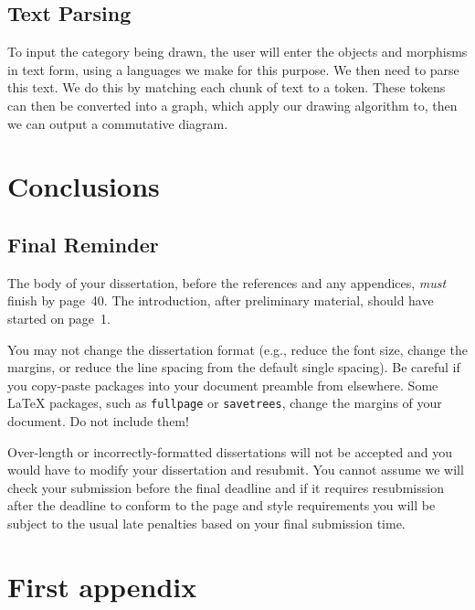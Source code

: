 \documentclass[logo,bsc,singlespacing,parskip]{infthesis}
\theoremstyle{definition}
\begin{document}
\section{Text Parsing}\label{bkg:text-parse}
To input the category being drawn, the user will enter the objects and morphisms in text form, using a languages we make for this purpose. We then need to parse this text. We do this by matching each chunk of text to a token. These tokens can then be converted into a graph, which apply our drawing algorithm to, then we can output a commutative diagram.

\chapter{Conclusions}

\section{Final Reminder}

The body of your dissertation, before the references and any appendices,
\emph{must} finish by page~40. The introduction, after preliminary material,
should have started on page~1.

You may not change the dissertation format (e.g., reduce the font size, change
the margins, or reduce the line spacing from the default single spacing). Be
careful if you copy-paste packages into your document preamble from elsewhere.
Some \LaTeX{} packages, such as \texttt{fullpage} or \texttt{savetrees}, change
the margins of your document. Do not include them!

Over-length or incorrectly-formatted dissertations will not be accepted and you
would have to modify your dissertation and resubmit. You cannot assume we will
check your submission before the final deadline and if it requires resubmission
after the deadline to conform to the page and style requirements you will be
subject to the usual late penalties based on your final submission time.

% 
%
%
\printbibliography


\appendix

\chapter{First appendix}
\end{document}
